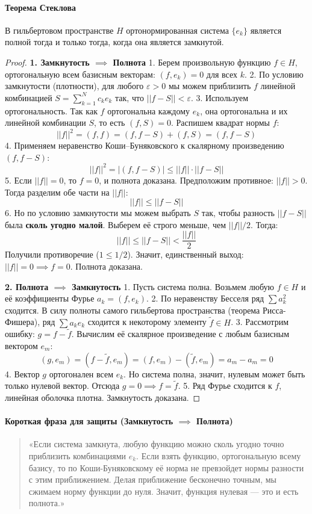 \paragraph{Теорема Стеклова}
В гильбертовом пространстве $H$ ортонормированная система $\{e_k\}$ является полной тогда и только тогда, когда она является замкнутой.

\begin{proof}
\textbf{1. Замкнутость $\implies$ Полнота}
1. Берем произвольную функцию $f \in H$, ортогональную всем базисным векторам: $(f, e_k) = 0$ для всех $k$.
2. По условию замкнутости (плотности), для любого $\varepsilon > 0$ мы можем приблизить $f$ линейной комбинацией $S = \sum_{k=1}^N c_k e_k$ так, что $||f - S|| < \varepsilon$.
3. Используем ортогональность. Так как $f$ ортогональна каждому $e_k$, она ортогональна и их линейной комбинации $S$, то есть $(f, S) = 0$.
Распишем квадрат нормы $f$:
$$ ||f||^2 = (f, f) = (f, f - S) + (f, S) = (f, f - S) $$
4. Применяем неравенство Коши–Буняковского к скалярному произведению $(f, f - S)$:
$$ ||f||^2 = |(f, f - S)| \le ||f|| \cdot ||f - S|| $$
5. Если $||f|| = 0$, то $f = 0$, и полнота доказана.
Предположим противное: $||f|| > 0$. Тогда разделим обе части на $||f||$:
$$ ||f|| \le ||f - S|| $$
6. Но по условию замкнутости мы можем выбрать $S$ так, чтобы разность $||f - S||$ была \textbf{сколь угодно малой}. Выберем её строго меньше, чем $||f||/2$. Тогда:
$$ ||f|| \le ||f - S|| < \frac{||f||}{2} $$
Получили противоречие ($1 \le 1/2$). Значит, единственный выход: $||f|| = 0 \implies f = 0$. Полнота доказана.

\textbf{2. Полнота $\implies$ Замкнутость}
1. Пусть система полна. Возьмем любую $f \in H$ и её коэффициенты Фурье $a_k = (f, e_k)$. 
2. По неравенству Бесселя ряд $\sum a_k^2$ сходится. В силу полноты самого гильбертова пространства (теорема Рисса-Фишера), ряд $\sum a_k e_k$ сходится к некоторому элементу $\tilde{f} \in H$.
3. Рассмотрим ошибку: $g = f - \tilde{f}$. Вычислим её скалярное произведение с любым базисным вектором $e_m$:
$$ (g, e_m) = (f - \tilde{f}, e_m) = (f, e_m) - (\tilde{f}, e_m) = a_m - a_m = 0 $$
4. Вектор $g$ ортогонален всем $e_k$. Но система полна, значит, нулевым может быть только нулевой вектор. Отсюда $g = 0 \implies f = \tilde{f}$.
5. Ряд Фурье сходится к $f$, линейная оболочка плотна. Замкнутость доказана.
\end{proof}

\paragraph{Короткая фраза для защиты (Замкнутость $\implies$ Полнота)}
\begin{quote}
«Если система замкнута, любую функцию можно сколь угодно точно приблизить комбинациями $e_k$. Если взять функцию, ортогональную всему базису, то по Коши-Буняковскому её норма не превзойдет нормы разности с этим приближением. Делая приближение бесконечно точным, мы сжимаем норму функции до нуля. Значит, функция нулевая — это и есть полнота.»
\end{quote}

